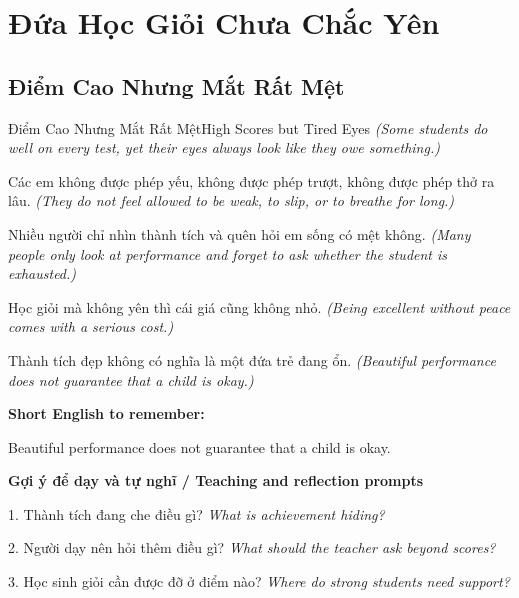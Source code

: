\chapter{Đứa Học Giỏi Chưa Chắc Yên}

\section{Điểm Cao Nhưng Mắt Rất Mệt}
\begin{truyen}{Điểm Cao Nhưng Mắt Rất Mệt}{High Scores but Tired Eyes}
\textit{(Some students do well on every test, yet their eyes always look like they owe something.)}

Các em không được phép yếu, không được phép trượt, không được phép thở ra lâu.
\textit{(They do not feel allowed to be weak, to slip, or to breathe for long.)}

Nhiều người chỉ nhìn thành tích và quên hỏi em sống có mệt không.
\textit{(Many people only look at performance and forget to ask whether the student is exhausted.)}

Học giỏi mà không yên thì cái giá cũng không nhỏ.
\textit{(Being excellent without peace comes with a serious cost.)}

\end{truyen}

\begin{baihoc}
Thành tích đẹp không có nghĩa là một đứa trẻ đang ổn.
\textit{(Beautiful performance does not guarantee that a child is okay.)}
\end{baihoc}

\begin{ghinhoanh}
\textbf{Short English to remember:}

Beautiful performance does not guarantee that a child is okay.

\end{ghinhoanh}

\begin{tuhocnhanh}
\textbf{Gợi ý để dạy và tự nghĩ / Teaching and reflection prompts}

1. Thành tích đang che điều gì? \textit{What is achievement hiding?}

2. Người dạy nên hỏi thêm điều gì? \textit{What should the teacher ask beyond scores?}

3. Học sinh giỏi cần được đỡ ở điểm nào? \textit{Where do strong students need support?}
\end{tuhocnhanh}
\ngancach

